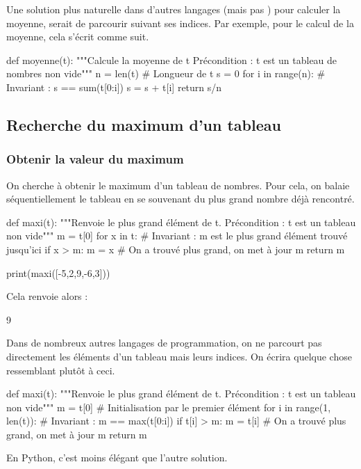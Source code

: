 

Une solution plus naturelle dans d'autres langages (mais pas \python) pour calculer la moyenne, 
serait de parcourir  suivant ses indices. Par exemple, pour le calcul de la moyenne, cela 
s'écrit comme suit.
\begin{pyverbatim}
def moyenne(t):
    """Calcule la moyenne de t
       Précondition : t est un tableau de nombres non vide"""
    n = len(t) # Longueur de t
    s = 0 
    for i in range(n):
        # Invariant : s == sum(t[0:i])
        s = s + t[i]
    return s/n 
\end{pyverbatim}



\subsection{Recherche du maximum d'un tableau}

\subsubsection{Obtenir la valeur du maximum}

On cherche à obtenir le maximum d'un tableau de nombres. Pour cela, on balaie séquentiellement le tableau en se souvenant du plus grand nombre déjà rencontré. 
\begin{pyverbatim}
def maxi(t):
    """Renvoie le plus grand élément de t.
       Précondition : t est un tableau non vide"""
    m = t[0]
    for x in t:
        # Invariant : m est le plus grand élément trouvé jusqu'ici
        if x > m:
            m = x # On a trouvé plus grand, on met à jour m
    return m

print(maxi([-5,2,9,-6,3]))
\end{pyverbatim}


Cela renvoie alors :
\begin{pyverbatim}
9
\end{pyverbatim}

Dans de nombreux autres langages de programmation, on ne parcourt pas directement les éléments d'un 
tableau mais leurs indices. On écrira
quelque chose ressemblant plutôt à ceci. 
\begin{pyverbatim}
def maxi(t):
    """Renvoie le plus grand élément de t.
       Précondition : t est un tableau non vide"""
    m = t[0] # Initialisation par le premier élément
    for i in range(1, len(t)):
        # Invariant : m == max(t[0:i])
        if t[i] > m:
            m = t[i] # On a trouvé plus grand, on met à jour m
    return m
\end{pyverbatim}
En Python, c'est moins élégant que l'autre solution.



